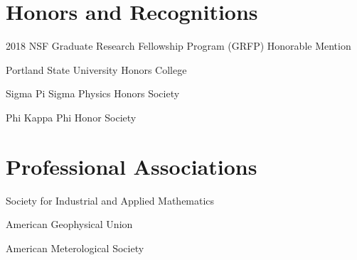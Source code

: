 \documentclass[]{deedy-resume-openfont}
\begin{document}

\section{Honors and Recognitions}
\vspace{\topsep} 
\begin{tightemize}
    \item 2018 NSF Graduate Research Fellowship Program (GRFP) Honorable Mention\\
    \item Portland State University Honors College\\
    \item Sigma Pi Sigma Physics Honors Society\\
    \item Phi Kappa Phi Honor Society\\
\end{tightemize}

\section{Professional Associations}
\vspace{\topsep} 
\begin{tightemize}
    \item Society for Industrial and Applied Mathematics\\
    \item American Geophysical Union\\
    \item American Meterological Society\\
\end{tightemize}
\end{document}

